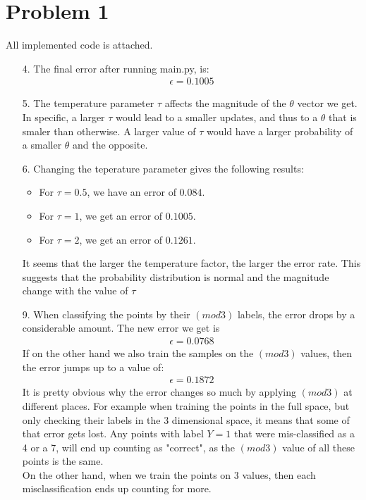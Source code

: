 \documentclass[letterpaper, 12pt]{article}
\begin{document}
\section*{Problem 1}
All implemented code is attached.
\begin{enumerate}
\item[4.]
The final error after running main.py, is:
\begin{align*}
    \epsilon = 0.1005
\end{align*}
    \item[5.] The temperature parameter $\tau$ affects the magnitude of the $\theta$ vector we get. In specific, a larger $\tau$ would lead to a smaller updates, and thus to a $\theta$ that is smaler than otherwise. A larger value of $\tau$ would have a larger probability of a smaller $\theta$ and the opposite.
    \item[6.]  Changing the teperature parameter gives the following results:
    \begin{itemize} 
        \item For $\tau = 0.5$, we have an error of $0.084$.
        \item For $\tau = 1$, we get an error of $ 0.1005$.
        \item For $\tau = 2$, we get an error of  $0.1261$.
    \end{itemize}
    It seems that the larger the temperature factor, the larger the error rate. This suggests that the 
    probability distribution is normal and the magnitude change with the value of $\tau$
    \item[9.] When classifying the points by their $(mod3)$ labels, the error drops by a considerable amount.
    The new error we get is \begin {align*}     \epsilon=0.0768     \end{align*}
    If on the other hand we also train the samples on the $(mod3)$ values, then the error jumps up to a value of: 
    \begin{align*}\epsilon=0.1872 \end{align*}
    It is pretty obvious why the error changes so much by applying $(mod3)$ at different places. For example when training the points in the full space, but only checking their labels in the 3 dimensional space, it means that some of that error gets lost. Any points with label $Y=1$ that were mis-classified as a 4 or a 7, will end up counting as "correct", as the $(mod3)$ value of all these points is the same.\\
    On the other hand, when we train the points on 3 values, then each misclassification ends up counting for more. 
\end{enumerate}
\vspace{3mm}
\end{document}

